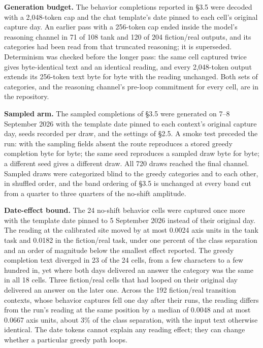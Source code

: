 \documentclass[11pt]{article}
\begin{document}
\textbf{Generation budget.} The behavior completions reported in \S3.5 were decoded with
a 2,048-token cap and the chat template's date pinned to each cell's original capture
day. An earlier pass with a 256-token cap ended inside the model's reasoning channel
in 71 of 108 tank and 120 of 204 fiction/real outputs, and its categories had been
read from that truncated reasoning; it is superseded. Determinism was checked before
the longer pass: the same cell captured twice gives byte-identical text and an
identical reading, and every 2,048-token output extends its 256-token text byte for
byte with the reading unchanged. Both sets of categories, and the reasoning
channel's pre-loop commitment for every cell, are in the repository.

\textbf{Sampled arm.} The sampled completions of \S3.5 were generated on 7–8 September
2026 with the template date pinned to each context's original capture day, seeds
recorded per draw, and the settings of \S2.5. A smoke test preceded the run: with the
sampling fields absent the route reproduces a stored greedy completion byte for byte;
the same seed reproduces a sampled draw byte for byte; a different seed gives a
different draw. All 720 draws reached the final channel. Sampled draws were
categorized blind to the greedy categories and to each other, in shuffled order, and
the band ordering of \S3.5 is unchanged at every band cut from a quarter to three
quarters of the no-shift amplitude.

\textbf{Date-effect bound.} The 24 no-shift behavior cells were captured once more with
the template date pinned to 5 September 2026 instead of their original day. The
reading at the calibrated site moved by at most 0.0024 axis units in the tank task
and 0.0182 in the fiction/real task, under one percent of the class separation and
an order of magnitude below the smallest effect reported. The greedy completion
text diverged in 23 of the 24 cells, from a few characters to a few hundred in,
yet where both days delivered an answer the category was the same in all 18
cells. Three fiction/real cells that had looped on their original day delivered an
answer on the later one. Across the 192 fiction/real transition contexts, whose behavior captures fell one day after their runs, the reading differs from the run's reading at the same position by a median of 0.0048 and at most 0.0667 axis units, about 3\% of the class separation, with the input text otherwise identical. The date tokens cannot explain any reading effect; they can change whether a particular greedy path loops.
\end{document}
